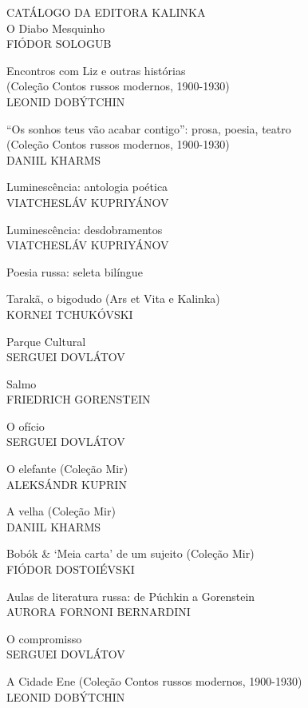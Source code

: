 \scriptsize{
\noindent{}CATÁLOGO DA EDITORA KALINKA\\[5pt]

\noindent{}O Diabo Mesquinho\\
FIÓDOR SOLOGUB
\medskip

\noindent{}Encontros com Liz e outras histórias\\(Coleção Contos russos modernos, 1900-1930)\\
LEONID DOBÝTCHIN
\medskip

\noindent{}“Os sonhos teus vão acabar contigo”: prosa, poesia, teatro\\(Coleção Contos russos modernos, 1900-1930)\\
DANIIL KHARMS
\medskip

\noindent{}Luminescência: antologia poética\\
VIATCHESLÁV KUPRIYÁNOV
\medskip

\noindent{}Luminescência: desdobramentos\\
VIATCHESLÁV KUPRIYÁNOV
\medskip

\noindent{}Poesia russa: seleta bilíngue
\medskip

\noindent{}Tarakã, o bigodudo (Ars et Vita e Kalinka)\\
KORNEI TCHUKÓVSKI
\medskip

\noindent{}Parque Cultural\\
SERGUEI DOVLÁTOV
\medskip

\noindent{}Salmo\\
FRIEDRICH GORENSTEIN
\medskip

\noindent{}O ofício\\
SERGUEI DOVLÁTOV
\medskip

\noindent{}O elefante (Coleção Mir)\\
ALEKSÁNDR KUPRIN
\medskip

\noindent{}A velha (Coleção Mir)\\
DANIIL KHARMS 
\medskip

\noindent{}Bobók \& ‘Meia carta’ de um sujeito (Coleção Mir)\\
FIÓDOR DOSTOIÉVSKI
\medskip

\noindent{}Aulas de literatura russa: de Púchkin a Gorenstein \\
AURORA FORNONI BERNARDINI
\medskip

\noindent{}O compromisso\\
SERGUEI DOVLÁTOV
\medskip

\noindent{}A Cidade Ene (Coleção Contos russos modernos, 1900-1930)\\
LEONID DOBÝTCHIN
\medskip

}
